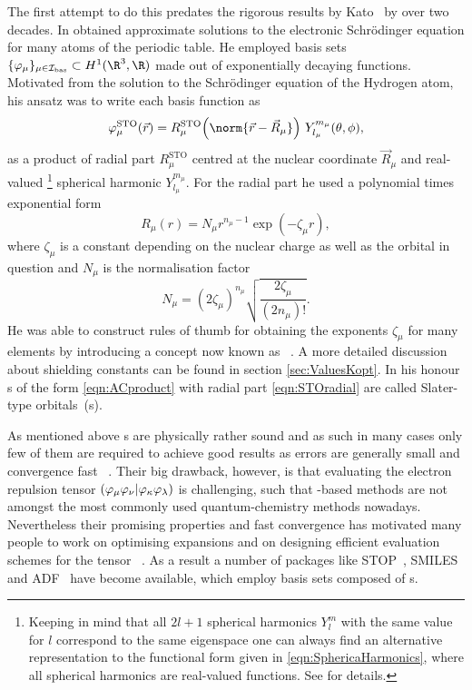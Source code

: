 The first attempt to do this predates the rigorous results by Kato~\cite{Kato1951,Kato1957}
by over two decades.
In \citeyear{Slater1930} \citet{Slater1930}
obtained approximate solutions to the electronic Schrödinger equation
for many atoms of the periodic table.
He employed basis sets $\{\varphi_\mu\}_{\mu\in\Ibas} \subset H^1(\R^3,\R)$
made out of exponentially decaying functions.
Motivated from the solution to the Schrödinger equation of the Hydrogen atom,
his ansatz was to write each basis function as
\begin{equation}
	\varphi^\text{STO}_\mu(\vec{r})
	= R^\text{STO}_\mu\!\left(\norm{\vec{r} - \vec{R}_\mu}\right)\, Y_{l_\mu}^{m_\mu}(\theta, \phi),
	\label{eqn:ACproduct}
\end{equation}
\ie as a product of radial part $R^\text{STO}_\mu$ centred at the nuclear
coordinate $\vec{R}_\mu$
and real-valued%
\footnote{Keeping in mind that all $2l+1$ spherical harmonics
	$Y_l^m$ with the same value for $l$ correspond to the same eigenspace
	one can always find an alternative representation to the functional
	form given in \eqref{eqn:SphericaHarmonics},
	where all spherical harmonics are real-valued functions.
	See \cite{Avery2018} for details.
} spherical harmonic $Y_{l_\mu}^{m_\mu}$.
For the radial part he used a polynomial times exponential form
\begin{equation}
	R_\mu(r) = N_\mu r^{n_{\mu}-1} \exp(-\zeta_\mu r),
	\label{eqn:STOradial}
\end{equation}
where $\zeta_\mu$
is a constant depending on the nuclear charge as well as
the orbital in question and
$N_\mu$ is the normalisation factor
\[ N_\mu = \left( 2\zeta_\mu \right)^{n_\mu} \sqrt{\frac{2\zeta_\mu}{(2n_\mu)!}}. \]
He was able to construct rules of thumb for obtaining the exponents $\zeta_\mu$
for many elements by introducing
a concept now known as ~\cite{Slater1930}.
A more detailed discussion about shielding constants
can be found in section \vref{sec:ValuesKopt}.
In his honour {\ETO}s of the form \eqref{eqn:ACproduct}
with radial part \eqref{eqn:STOradial}
are called Slater-type orbitals~({\STO}s).

As mentioned above {\STO}s are physically rather sound
and as such in many cases only few of them are required to achieve good results
as errors are generally small and convergence fast%
~\cite{Shepard2007,Guell2008,Hoggan2009,Hoggan2011}.
Their big drawback, however,
is that evaluating the electron repulsion tensor
$\left( \varphi_\mu \varphi_\nu \middle| \varphi_\kappa \varphi_\lambda \right)$
is challenging,
such that \STO-based methods
are not amongst the most commonly used quantum-chemistry methods nowadays.
Nevertheless their promising properties and fast convergence
has motivated many people to work on optimising \STO expansions
and on designing efficient evaluation schemes for the \ERI tensor%
~\cite{Weniger1983,Hoggan2009,Hoggan2011,Avery2013,Avery2017}.
As a result a number of packages
like STOP~\cite{Bouferguene1996},
SMILES~\cite{FernandezRico2001}
and ADF~\cite{Velde2001}
have become available,
which employ basis sets composed of {\STO}s.
